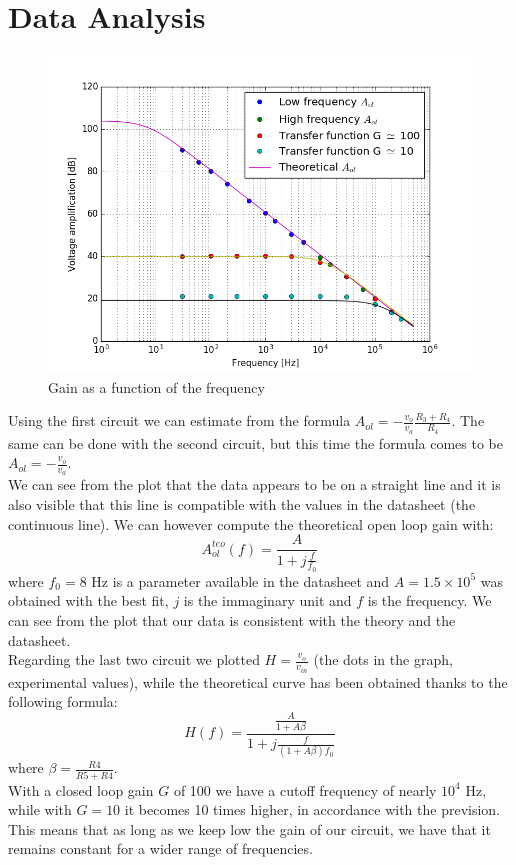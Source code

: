 \section{Data Analysis}
\begin{figure}[H]
\centering
\includegraphics[width=.7\textwidth]{4/decibel.png}
\caption{Gain as a function of the frequency}
\end{figure}
Using the first circuit we can estimate from the formula $A_{ol} = - \frac{v_{o}}{v_a} \frac{R_3 + R_4}{R_4}$.
The same can be done with the second circuit, but this time the formula comes to be $A_{ol} = - \frac{v_{o}}{v_a}$. \\
We can see from the plot that the data appears to be on a straight line and it is also visible that this line is compatible with the values in the datasheet (the continuous line).
We can  however compute the theoretical open loop gain with: $$A_{ol}^{teo}(f) = \frac{A}{1 + j\frac{f}{f_0}}$$ where $f_0 = 8$ Hz is a parameter available in the datasheet and  $A = 1.5 \times 10^5$ was obtained with the best fit, $j$ is the immaginary unit and $f$ is the frequency. We can see from the plot that our data is consistent with the theory and the datasheet.\\
Regarding the last two circuit we plotted $H = \frac{v_{o}}{v_{in}}$ (the dots in the graph, experimental values), while the theoretical curve has been obtained thanks to the following formula:
\[H(f) = \frac{\frac{A}{1 + A \beta}}{1 + j \frac{f}{(1 + A \beta)f_0}}\]
where $\beta = \frac{R4}{R5+R4}$.\\
With a closed loop gain $G$ of 100 we have a cutoff frequency of nearly $10^4$ Hz, while with $G = 10$ it becomes 10 times higher, in accordance with the prevision. This means that as long as we keep low the gain of our circuit, we have that it remains constant for a wider range of frequencies. 
